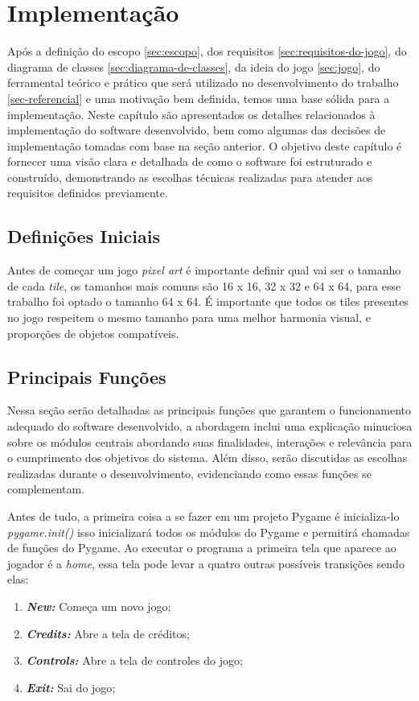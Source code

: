 \chapter{Implementação}
\label{sec-implementacao}
Após a definição do escopo \ref{sec:escopo}, dos requisitos \ref{sec:requisitos-do-jogo}, do diagrama de classes \ref{sec:diagrama-de-classes}, da ideia do jogo \ref{sec:jogo}, do ferramental teórico e prático que será utilizado no desenvolvimento do trabalho \ref{sec-referencial} e uma motivação bem definida, temos uma base sólida para a implementação. Neste capítulo são apresentados os detalhes relacionados à implementação do software desenvolvido, bem como algumas das decisões de implementação tomadas com base na seção anterior. O objetivo deste capítulo é fornecer uma visão clara e detalhada de como o software foi estruturado e construído, demonstrando as escolhas técnicas realizadas para atender aos requisitos definidos previamente.

\section{Definições Iniciais}
Antes de começar um jogo \textit{pixel art} é importante definir qual vai ser o tamanho de cada \textit{tile}, os tamanhos mais comuns são 16 x 16, 32 x 32 e 64 x 64, para esse trabalho foi optado o tamanho 64 x 64. É importante que todos os tiles presentes no jogo respeitem o mesmo tamanho para uma melhor harmonia visual, e proporções de objetos compatíveis.

\section{Principais Funções}
Nessa seção serão detalhadas as principais funções que garantem o funcionamento adequado do software desenvolvido, a abordagem inclui uma explicação minuciosa sobre os módulos centrais abordando suas finalidades, interações e relevância para o cumprimento dos objetivos do sistema. Além disso, serão discutidas as escolhas realizadas durante o desenvolvimento, evidenciando como essas funções se complementam.

Antes de tudo, a primeira coisa a se fazer em um projeto Pygame é inicializa-lo \textit{pygame.init()} isso inicializará todos os módulos do Pygame e permitirá chamadas de funções do Pygame. Ao executar o programa a primeira tela que aparece ao jogador é a \textit{home}, essa tela pode levar a quatro outras possíveis transições sendo elas:
\begin{enumerate}
    \item \textbf{\textit{New: }} Começa um novo jogo;
    \item \textbf{\textit{Credits: }} Abre a tela de créditos;
    \item \textbf{\textit{Controls: }} Abre a tela de controles do jogo;
    \item \textbf{\textit{Exit: }} Sai do jogo;
\end{enumerate}

